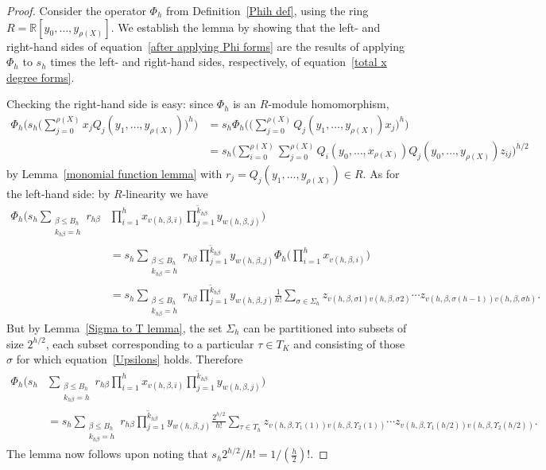 \documentclass[12pt,reqno]{amsart}
\theoremstyle{definition}
\newcommand{\R}{{\mathbb R}}
\begin{document}
\begin{proof}
Consider the operator $\Phi_h$ from Definition~\ref{Phih def}, using the ring $R = \R[y_0,\dots,y_{\rho(X)}]$. We establish the lemma by showing that the left- and right-hand sides of equation~\eqref{after applying Phi forms} are the results of applying $\Phi_h$ to $s_h$ times the left- and right-hand sides, respectively, of equation~\eqref{total x degree forms}.

Checking the right-hand side is easy: since $\Phi_h$ is an $R$-module homomorphism,
\begin{align*}
\Phi_h\bigg( s_h \bigg( \sum_{j=0}^{\rho(X)} x_j Q_j(y_1,\dots,y_{\rho(X)}) \bigg)^h \bigg) &= s_h \Phi_h\bigg( \bigg( \sum_{j=0}^{\rho(X)} Q_j(y_1,\dots,y_{\rho(X)}) x_j \bigg)^h \bigg) \\
&= s_h \bigg( \sum_{i=0}^{\rho(X)} \sum_{j=0}^{\rho(X)} Q_i(y_0,\dots,x_{\rho(X)}) Q_j(y_0,\dots,y_{\rho(X)}) z_{ij} \bigg)^{h/2}
\end{align*}
by Lemma~\ref{monomial function lemma} with $r_j = Q_j(y_1,\dots,y_{\rho(X)}) \in R$. As for the left-hand side: by $R$-linearity we have
\begin{align*}
\Phi_h \bigg( s_h \sum_{\substack{\beta\le B_h \\ k_{h\beta}=h}} r_{h\beta} & \prod_{i=1}^h x_{v(h,\beta, i)} \prod_{j=1}^{\tilde k_{h\beta}} y_{w(h,\beta,j)} \bigg) \\
&= s_h \sum_{\substack{\beta\le B_h \\ k_{h\beta}=h}} r_{h\beta} \prod_{j=1}^{\tilde k_{h\beta}} y_{w(h,\beta,j)} \Phi_h \bigg( \prod_{i=1}^h x_{v(h,\beta, i)} \bigg) \\
&= s_h \sum_{\substack{\beta\le B_h \\ k_{h\beta}=h}} r_{h\beta} \prod_{j=1}^{\tilde k_{h\beta}} y_{w(h,\beta,j)} \frac1{h!} \sum_{\sigma\in\Sigma_h} z_{v(h,\beta, \sigma1)v(h,\beta, \sigma2)} \cdots z_{v(h,\beta, \sigma(h-1))v(h,\beta, \sigma h)}.
\end{align*}
But by Lemma~\ref{Sigma to T lemma}, the set $\Sigma_h$ can be partitioned into subsets of size $2^{h/2}$, each subset corresponding to a particular $\tau\in T_K$ and consisting of those $\sigma$ for which equation~\eqref{Upsilons} holds. Therefore
\begin{align*}
\Phi_h \bigg( s_h & \sum_{\substack{\beta\le B_h \\ k_{h\beta}=h}} r_{h\beta}  \prod_{i=1}^h x_{v(h,\beta, i)} \prod_{j=1}^{\tilde k_{h\beta}} y_{w(h,\beta,j)} \bigg) \\
&= s_h \sum_{\substack{\beta\le B_h \\ k_{h\beta}=h}} r_{h\beta} \prod_{j=1}^{\tilde k_{h\beta}} y_{w(h,\beta,j)} \frac{2^{h/2}}{h!} \sum_{\tau\in T_h} z_{v(h,\beta, \Upsilon_1(1))v(h,\beta, \Upsilon_2(1))} \cdots z_{v(h,\beta, \Upsilon_1(h/2))v(h,\beta, \Upsilon_2(h/2))}.
\end{align*}
The lemma now follows upon noting that $s_h2^{h/2}/h! = 1/(\frac h2)!$.
\end{proof}
\end{document}

